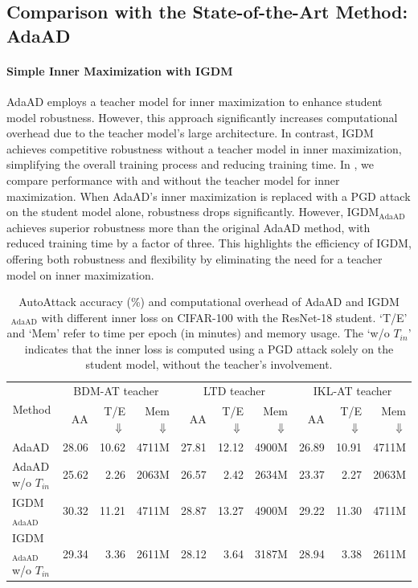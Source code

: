 \documentclass{article} %
\begin{document}
\subsection{Comparison with the State-of-the-Art Method: AdaAD}

\paragraph{Simple Inner Maximization with IGDM} AdaAD \citep{adaad} employs a teacher model for inner maximization to enhance student model robustness. 
However, this approach significantly increases computational overhead due to the teacher model's large architecture. 
In contrast, IGDM achieves competitive robustness without a teacher model in inner maximization, simplifying the overall training process and reducing training time.
In , we compare performance with and without the teacher model for inner maximization. 
When AdaAD's inner maximization is replaced with a PGD attack on the student model alone, robustness drops significantly. However, IGDM$_{\text{AdaAD}}$ achieves superior robustness more than the original AdaAD method, with reduced training time by a factor of three.
This highlights the efficiency of IGDM, offering both robustness and flexibility by eliminating the need for a teacher model on inner maximization.

\begin{table}[h]
 \centering
 \caption{AutoAttack accuracy (\%) and computational overhead of AdaAD and IGDM$_{\text{AdaAD}}$ with different inner loss on CIFAR-100 with the ResNet-18 student. `T/E' and `Mem' refer to time per epoch (in minutes) and memory usage.
 The `w/o $T_{in}$' indicates that the inner loss is computed using a PGD attack solely on the student model, without the teacher's involvement.
}
 \setlength{\tabcolsep}{5pt}
 \begin{tabular}{lrrrrrrrrr}
 \toprule
 \multicolumn{1}{c}{\multirow{2}{*}{Method}}  & \multicolumn{3}{c}{BDM-AT teacher}&  \multicolumn{3}{c}{LTD teacher} & \multicolumn{3}{c}{IKL-AT teacher}\\
\cmidrule(r){2-4}\cmidrule(r){5-7}\cmidrule(r){8-10} & AA & T/E$\Downarrow$  &Mem$\Downarrow$& AA & T/E$\Downarrow$ &Mem$\Downarrow$ & AA & T/E$\Downarrow$ &Mem$\Downarrow$ \\
 \midrule
AdaAD  & 28.06 & 10.62 
&4711M& 27.81 &12.12 
& 4900M& 26.89& 10.91&4711M
\\
AdaAD w/o $T_{in}$ &  
25.62 & 2.26 
&2063M&  
26.57 &2.42 
& 2634M& 23.37& 2.27&2063M
\\
IGDM$_{\text{AdaAD}}$ &  30.32 & 11.21 
&4711M&  28.87 &13.27 
& 4900M & 29.22& 11.30&4711M
\\
IGDM$_{\text{AdaAD}}$ w/o $T_{in}$ &  
 29.34 & 3.36  &2611M&  
 28.12 &3.64  & 3187M& 28.94& 3.38&2611M\\
 \bottomrule
 \end{tabular}

 \label{tab:AdaAD_time}
\end{table}
\end{document}
